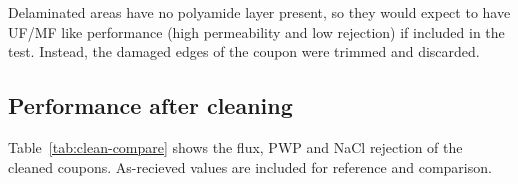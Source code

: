 Delaminated areas have no polyamide layer present, so they would expect to have UF/MF like performance (high permeability and low rejection) if included in the test. Instead, the damaged edges of the coupon were trimmed and discarded.


\subsection{Performance after cleaning}
\label{sec:res-cleaning-perf}

Table~\ref{tab:clean-compare} shows the flux, PWP and NaCl rejection of the cleaned coupons. As-recieved values are included for reference and comparison.
